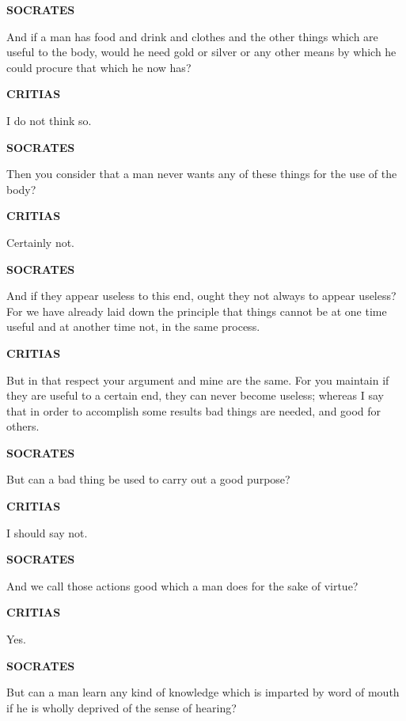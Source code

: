 \documentclass[11pt,letter]{article}
\begin{document}
\par \textbf{SOCRATES}
\par   And if a man has food and drink and clothes and the other things which are useful to the body, would he need gold or silver or any other means by which he could procure that which he now has?

\par \textbf{CRITIAS}
\par   I do not think so.

\par \textbf{SOCRATES}
\par   Then you consider that a man never wants any of these things for the use of the body?

\par \textbf{CRITIAS}
\par   Certainly not.

\par \textbf{SOCRATES}
\par   And if they appear useless to this end, ought they not always to appear useless? For we have already laid down the principle that things cannot be at one time useful and at another time not, in the same process.

\par \textbf{CRITIAS}
\par   But in that respect your argument and mine are the same. For you maintain if they are useful to a certain end, they can never become useless; whereas I say that in order to accomplish some results bad things are needed, and good for others.

\par \textbf{SOCRATES}
\par   But can a bad thing be used to carry out a good purpose?

\par \textbf{CRITIAS}
\par   I should say not.

\par \textbf{SOCRATES}
\par   And we call those actions good which a man does for the sake of virtue?

\par \textbf{CRITIAS}
\par   Yes.

\par \textbf{SOCRATES}
\par   But can a man learn any kind of knowledge which is imparted by word of mouth if he is wholly deprived of the sense of hearing?
\end{document}
